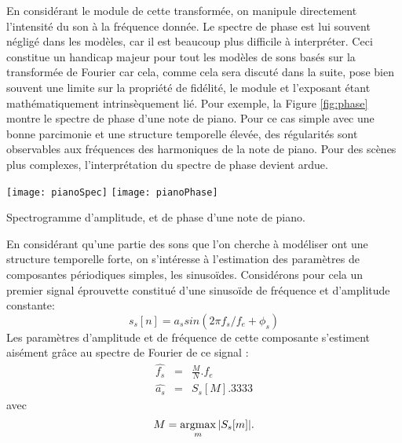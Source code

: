 En considérant le module de cette transformée, on manipule directement l'intensité du son à la fréquence donnée. Le spectre de phase est lui souvent négligé dans les modèles, car il est beaucoup plus difficile à interpréter. Ceci constitue un handicap majeur pour tout les modèles de sons basés sur la transformée de Fourier car cela, comme cela sera discuté dans la suite, pose bien souvent une limite sur la propriété de fidélité, le module et l'exposant étant mathématiquement intrinsèquement lié. Pour exemple, la Figure \ref{fig:phase} montre le spectre de phase d'une note de piano. Pour ce cas simple avec une bonne parcimonie et une structure temporelle élevée, des régularités sont observables aux fréquences des harmoniques de la note de piano. Pour des scènes plus complexes, l'interprétation du spectre de phase devient ardue.

\begin{marginfigure}
  \texttt{[image: pianoSpec]}
  \texttt{[image: pianoPhase]}
  \caption{Spectrogramme d'amplitude, et de phase d'une note de piano.}
  \label{fig:phase}
\end{marginfigure}

En considérant qu'une partie des sons que l'on cherche à modéliser ont une structure temporelle forte, on s'intéresse à l'estimation des paramètres de composantes périodiques simples, les sinusoïdes. Considérons pour cela un premier signal \og éprouvette \fg constitué d'une sinusoïde de fréquence et d'amplitude constante:
\begin{equation}
  s_s[n] = a_s sin(2\pi f_s/f_e + \phi_s)
  \label{eq:sin_toy}
\end{equation}
Les paramètres d'amplitude et de fréquence de cette composante s'estiment aisément grâce au spectre de Fourier de ce signal :
\begin{eqnarray}
  \hat{f_s} &=&  \frac{M}{N} . f_e\\
  \hat{a_s} &=& S_s[M].3333
\end{eqnarray}
avec
\begin{equation}
  M = \operatorname*{argmax}_m | S_s[m] |.
  \label{eq:sin_toy_select}
\end{equation}

